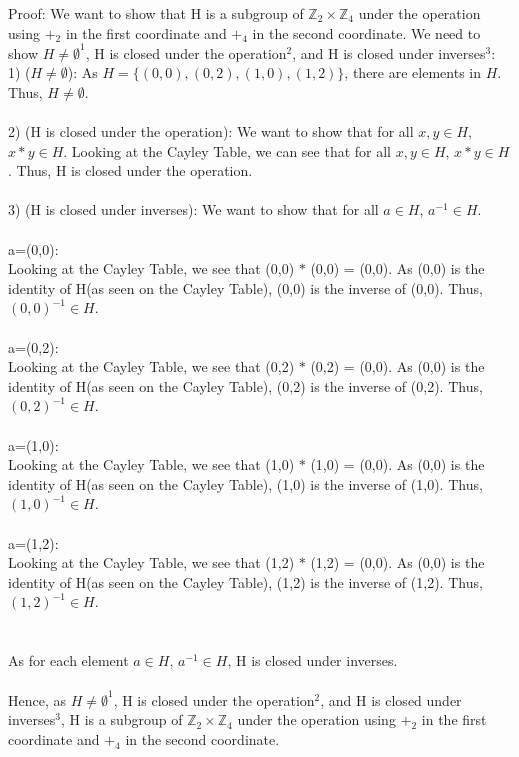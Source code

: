 \documentclass[11pt]{amsart}
\begin{document}
\vskip 0.2in
Proof: We want to show that H is a subgroup of $\mathbb{Z}_{2} \times \mathbb{Z}_{4}$ under the operation using $+_2$ in the first coordinate and $+_4$ in the second coordinate. We need to show $H\neq \emptyset ^1$, H is closed under the operation$^2$, and H is closed under inverses$^3$:
\\1) ($H\neq \emptyset$): As $H = \{(0,0), (0,2), (1, 0), (1,2)\}$, there are elements in $H$. Thus, $H\neq \emptyset$.
\\
\\2) (H is closed under the operation): We want to show that for all $x,y\in H$, $x\ast y\in H$. Looking at the Cayley Table, we can see that for all $x,y\in H$, $x\ast y\in H$. Thus, H is closed under the operation.
\\
\\3) (H is closed under inverses): We want to show that for all $a\in H$, $a^{-1}\in H$. \\
\\a=(0,0): \\Looking at the Cayley Table, we see that (0,0) $\ast$ (0,0) = (0,0). As (0,0) is the identity of H(as seen on the Cayley Table), (0,0) is the inverse of (0,0). Thus, $(0,0)^{-1}\in H$.\\
\\a=(0,2): \\Looking at the Cayley Table, we see that (0,2) $\ast$ (0,2) = (0,0). As (0,0) is the identity of H(as seen on the Cayley Table), (0,2) is the inverse of (0,2). Thus, $(0,2)^{-1}\in H$.\\
\\a=(1,0): \\Looking at the Cayley Table, we see that (1,0) $\ast$ (1,0) = (0,0). As (0,0) is the identity of H(as seen on the Cayley Table), (1,0) is the inverse of (1,0). Thus, $(1,0)^{-1}\in H$.\\
\\a=(1,2): \\Looking at the Cayley Table, we see that (1,2) $\ast$ (1,2) = (0,0). As (0,0) is the identity of H(as seen on the Cayley Table), (1,2) is the inverse of (1,2). Thus, $(1,2)^{-1}\in H$.\\
\\
\\As for each element $a\in H$, $a^{-1}\in H$, H is closed under inverses.
\\
\\Hence, as $H\neq \emptyset ^1$, H is closed under the operation$^2$, and H is closed under inverses$^3$, H is a subgroup of $\mathbb{Z}_{2} \times \mathbb{Z}_{4}$ under the operation using $+_2$ in the first coordinate and $+_4$ in the second coordinate.
\\
\\
\end{document}
